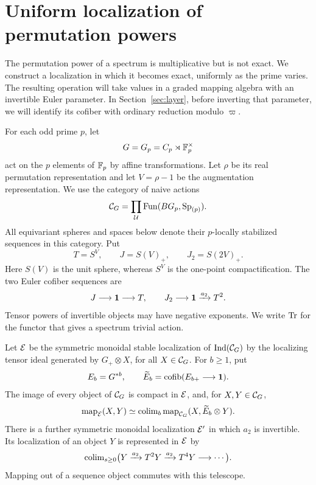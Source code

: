 \section{Uniform localization of permutation powers}
\label{sec:power}

The permutation power of a spectrum is multiplicative but is not exact.
We construct a localization in which it becomes exact, uniformly as the
prime varies. The resulting operation will take values in a graded
mapping algebra with an invertible Euler parameter. In
Section~\ref{sec:layer}, before inverting that parameter, we will identify
its cofiber with ordinary reduction modulo $\varpi$.

For each odd prime $p$, let
\[
 G=G_p=C_p\rtimes\mathbb F_p^\times
\]
act on the $p$ elements of $\mathbb F_p$ by affine transformations. Let $\rho$
be its real permutation representation and let $V=\rho-1$ be the
augmentation representation. We use the category of naive actions
\[
 \mathcal C_G=\prod_{\mathcal U}\operatorname{Fun}(BG_p,\mathrm{Sp}_{(p)}).
\]
All equivariant spheres and spaces below denote their $p$-locally
stabilized sequences in this category. Put
\[
 T=S^V,\qquad J=S(V)_+,\qquad J_2=S(2V)_+.
\]
Here $S(V)$ is the unit sphere, whereas $S^V$ is the one-point
compactification. The two Euler cofiber sequences are
\begin{equation}
 \label{power:euler-triangles}
 J\longrightarrow\mathbf 1\longrightarrow T,
 \qquad
 J_2\longrightarrow\mathbf 1\xrightarrow{a_2}T^2.
\end{equation}
Tensor powers of invertible objects may have negative exponents. We
write $\operatorname{Tr}$ for the functor that gives a spectrum trivial action.

\begin{lemma}
\label{power:localizations}
Let $\mathcal E$ be the symmetric monoidal stable localization of
$\mathrm{Ind}(\mathcal C_G)$ by the localizing tensor ideal generated by
$G_+\otimes X$, for all $X\in\mathcal C_G$. For $b\geq1$, put
\[
 E_b=G^{*b},\qquad
 \widetilde E_b=\operatorname{cofib}(E_{b+}\longrightarrow\mathbf 1).
\]
The image of every object of $\mathcal C_G$ is compact in $\mathcal E$, and, for
$X,Y\in\mathcal C_G$,
\begin{equation}
 \label{power:join-formula}
 \operatorname{map}_{\mathcal E}(X,Y)
 \simeq\operatorname{colim}_b\operatorname{map}_{\mathcal C_G}(X,\widetilde E_b\otimes Y).
\end{equation}
There is a further symmetric monoidal localization $\mathcal E'$ in which
$a_2$ is invertible. Its localization of an object $Y$ is represented
in $\mathcal E$ by
\[
 \operatorname{colim}_{s\geq0}
 \bigl(Y\xrightarrow{a_2}T^2Y\xrightarrow{a_2}T^4Y
 \longrightarrow\cdots\bigr).
\]
Mapping out of a sequence object commutes with this telescope.
\end{lemma}

